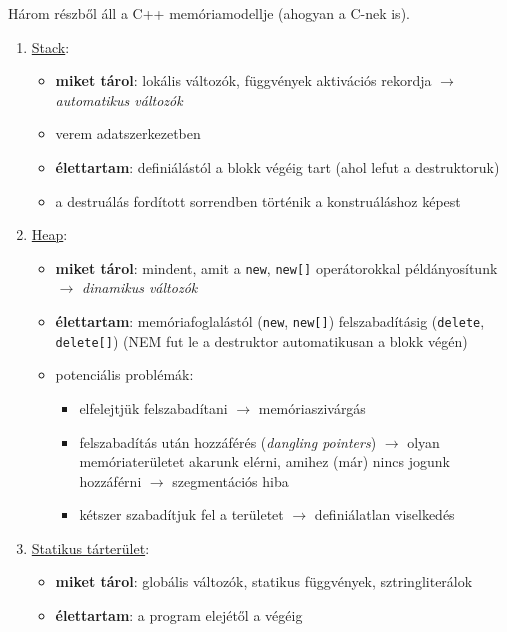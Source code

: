 \documentclass[a4paper, 11pt, oneside]{book}
\begin{document}
Három részből áll a C++ memóriamodellje (ahogyan a C-nek is).

\begin{enumerate}[label=\Roman{*}.)]
	\item \underline{Stack}:
	
	\begin{itemize}
		\item \textbf{miket tárol}: lokális változók, függvények aktivációs rekordja $\to$ \textit{automatikus változók}
		\item verem adatszerkezetben
		\item \textbf{élettartam}: definiálástól a blokk végéig tart (ahol lefut a destruktoruk)
		\item a destruálás fordított sorrendben történik a konstruáláshoz képest
	\end{itemize}
	
	\item \underline{Heap}:
	
	\begin{itemize}
		\item \textbf{miket tárol}: mindent, amit a \verb*|new|, \verb*|new[]| operátorokkal példányosítunk $\to$ \textit{dinamikus változók}
		\item \textbf{élettartam}: memóriafoglalástól (\verb*|new|, \verb*|new[]|) felszabadításig (\verb*|delete|, \verb*|delete[]|) (NEM fut le a destruktor automatikusan a blokk végén)
		\item potenciális problémák:
		\begin{itemize}
			\item elfelejtjük felszabadítani $\to$ memóriaszivárgás
			\item felszabadítás után hozzáférés (\textit{dangling pointers}) $\to$ olyan memóriaterületet akarunk elérni, amihez (már) nincs jogunk hozzáférni $\to$ szegmentációs hiba
			\item kétszer szabadítjuk fel a területet $\to$ definiálatlan viselkedés
		\end{itemize}
	\end{itemize}
	
	\item \underline{Statikus tárterület}:
	
	\begin{itemize}
		\item \textbf{miket tárol}: globális változók, statikus függvények, sztringliterálok
		\item \textbf{élettartam}: a program elejétől a végéig
	\end{itemize}
\end{enumerate}
\end{document}
